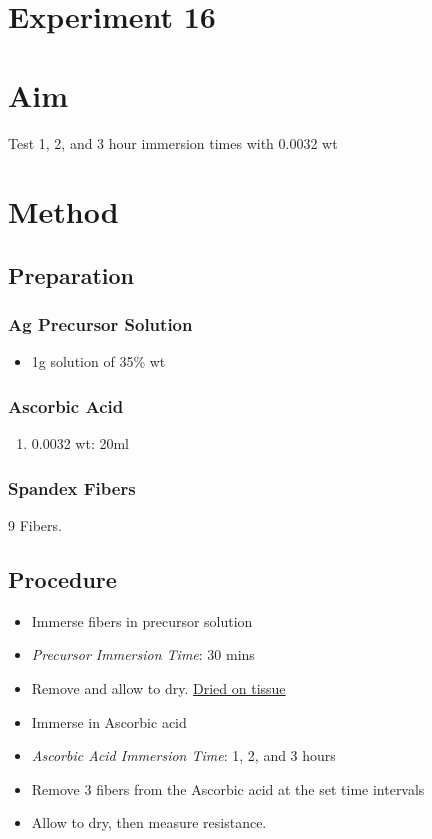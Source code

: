 \documentclass{article}
\begin{document}
\section*{Experiment 16}

\section{Aim}
Test 1, 2, and 3 hour immersion times with 0.0032 wt

\section{Method}
\subsection{Preparation}
\subsubsection{Ag Precursor Solution}
\begin{itemize}
    \item  1g solution of  35\% wt
\end{itemize}

\subsubsection{Ascorbic Acid}
\begin{enumerate}
    \item 0.0032 wt: 20ml
\end{enumerate}

\subsubsection{Spandex Fibers}
9 Fibers. 
\subsection{Procedure}
\begin{itemize}
    \item Immerse fibers in precursor solution
    \item \textit{Precursor Immersion Time}: 30 mins
    \item Remove and allow to dry. \underline{Dried on tissue}
    \item Immerse in Ascorbic acid
    \item \textit{Ascorbic Acid Immersion Time}: 1, 2, and 3 hours
    \item Remove 3 fibers from the Ascorbic acid at the set time intervals 
    \item Allow to dry, then measure resistance.
\end{itemize}
\end{document}
